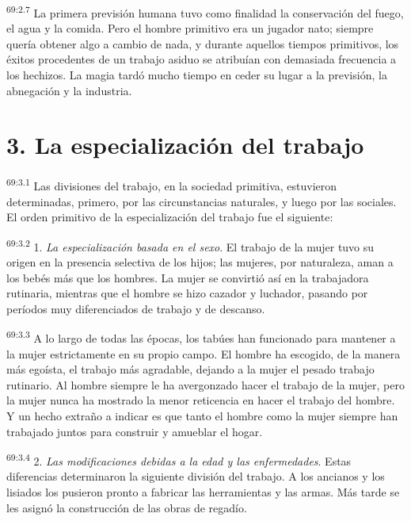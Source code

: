 \par
\textsuperscript{69:2.7} La primera previsión humana tuvo como finalidad la conservación del fuego, el agua y la comida. Pero el hombre primitivo era un jugador nato; siempre quería obtener algo a cambio de nada, y durante aquellos tiempos primitivos, los éxitos procedentes de un trabajo asiduo se atribuían con demasiada frecuencia a los hechizos. La magia tardó mucho tiempo en ceder su lugar a la previsión, la abnegación y la industria.

\section*{3. La especialización del trabajo}
\par
\textsuperscript{69:3.1} Las divisiones del trabajo, en la sociedad primitiva, estuvieron determinadas, primero, por las circunstancias naturales, y luego por las sociales. El orden primitivo de la especialización del trabajo fue el siguiente:

\par
\textsuperscript{69:3.2} 1. \textit{La especialización basada en el sexo}. El trabajo de la mujer tuvo su origen en la presencia selectiva de los hijos; las mujeres, por naturaleza, aman a los bebés más que los hombres. La mujer se convirtió así en la trabajadora rutinaria, mientras que el hombre se hizo cazador y luchador, pasando por períodos muy diferenciados de trabajo y de descanso.

\par
\textsuperscript{69:3.3} A lo largo de todas las épocas, los tabúes han funcionado para mantener a la mujer estrictamente en su propio campo. El hombre ha escogido, de la manera más egoísta, el trabajo más agradable, dejando a la mujer el pesado trabajo rutinario. Al hombre siempre le ha avergonzado hacer el trabajo de la mujer, pero la mujer nunca ha mostrado la menor reticencia en hacer el trabajo del hombre. Y un hecho extraño a indicar es que tanto el hombre como la mujer siempre han trabajado juntos para construir y amueblar el hogar.

\par
\textsuperscript{69:3.4} 2. \textit{Las modificaciones debidas a la edad y las enfermedades}. Estas diferencias determinaron la siguiente división del trabajo. A los ancianos y los lisiados los pusieron pronto a fabricar las herramientas y las armas. Más tarde se les asignó la construcción de las obras de regadío.

